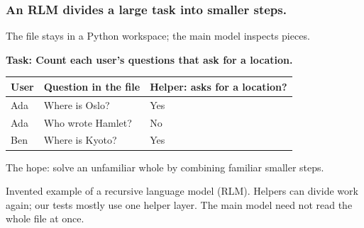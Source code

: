 \documentclass[aspectratio=169,11pt]{beamer}
\newcommand{\smallnote}[1]{\vfill{\scriptsize\color{Muted}#1\par}}
\begin{document}
\begin{frame}[t]
\frametitle{An RLM divides a large task into smaller steps.}
The file stays in a Python workspace; the main model inspects pieces.\par
\vspace{1mm}
\textbf{Task: Count each user's questions that ask for a location.}\par
\vspace{2mm}
\centering
\renewcommand{\arraystretch}{1.0}
\begin{tabular}{lll}
\toprule
User & Question in the file & Helper: asks for a location? \\
\midrule
Ada & Where is Oslo? & Yes \\
Ada & Who wrote Hamlet? & No \\
Ben & Where is Kyoto? & Yes \\
\bottomrule
\end{tabular}
\par\vspace{2mm}
\par\vspace{2mm}
\raggedright
The hope: solve an unfamiliar whole by combining familiar smaller steps.
\smallnote{Invented example of a recursive language model (RLM). Helpers can divide work again; our tests mostly use one helper layer. The main model need not read the whole file at once.}
\end{frame}
\end{document}
